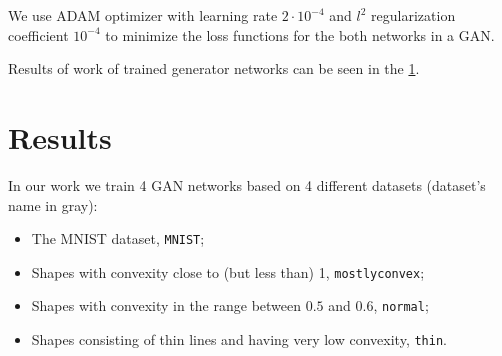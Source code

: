 \documentclass[reprint,amsmath,amssymb,aps,pre,showkeys,showpacs]{revtex4-1}
\newcommand{\code}[1]{\colorbox{light-gray}{\texttt{#1}}}
\begin{document}
We use ADAM optimizer\cite{kingma2014adam} with learning rate $2 \cdot 10^{-4}$
and $l^2$ regularization coefficient $10^{-4}$ to minimize the loss functions
for the both networks in a GAN.

Results of work of trained generator networks can be seen in the
\cref{sec:results}.

\section{Results}
\label{sec:results}
In our work we train 4 GAN networks based on 4 different datasets (dataset's
name in gray):
\begin{itemize}
\item The MNIST dataset, \code{MNIST};
\item Shapes with convexity close to (but less than) 1, \code{mostlyconvex};
\item Shapes with convexity in the range between $0.5$ and $0.6$, \code{normal};
\item Shapes consisting of thin lines and having very low convexity, \code{thin}.
\end{itemize}
\end{document}
